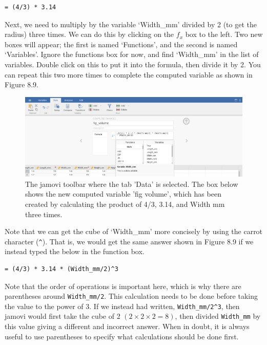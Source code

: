 \documentclass[
]{scrbook}
\begin{document}
\begin{verbatim}
= (4/3) * 3.14
\end{verbatim}

Next, we need to multiply by the variable `Width\_mm' divided by 2 (to get the radius) three times.
We can do this by clicking on the \(f_{x}\) box to the left.
Two new boxes will appear; the first is named `Functions', and the second is named `Variables'.
Ignore the functions box for now, and find `Width\_mm' in the list of variables.
Double click on this to put it into the formula, then divide it by 2.
You can repeat this two more times to complete the computed variable as shown in Figure 8.9.

\begin{figure}
\includegraphics[width=1\linewidth]{img/jamovi_compute_new_variable} \caption{The jamovi toolbar where the tab 'Data' is selected. The box below shows the new computed variable 'fig volume', which has been created by calculating the product of 4/3, 3.14, and Width mm three times.}\label{fig:unnamed-chunk-33}
\end{figure}

Note that we can get the cube of `Width\_mm' more concisely by using the carrot character (\texttt{\^{}}).
That is, we would get the same answer shown in Figure 8.9 if we instead typed the below in the function box.

\begin{verbatim}
= (4/3) * 3.14 * (Width_mm/2)^3
\end{verbatim}

Note that the order of operations is important here, which is why there are parentheses around \texttt{Width\_mm/2}. This calculation needs to be done before taking the value to the power of 3.
If we instead had written, \texttt{Width\_mm/2\^{}3}, then jamovi would first take the cube of 2 \((2 \times 2 \times 2 = 8)\), then divided \texttt{Width\_mm} by this value giving a different and incorrect answer.
When in doubt, it is always useful to use parentheses to specify what calculations should be done first.
\end{document}

